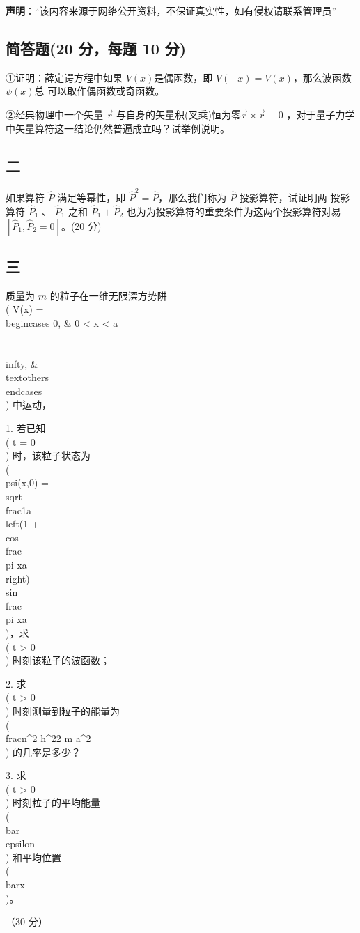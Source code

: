 
\textbf{声明}：“该内容来源于网络公开资料，不保证真实性，如有侵权请联系管理员”

\subsection{简答题(20 分，每题 10 分)}
①证明：薛定谔方程中如果 $V(x)$是偶函数，即 $V(-x)=V(x)$，那么波函数 $\psi(x)$总
可以取作偶函数或奇函数。

②经典物理中一个矢量 $\vec r$ 与自身的矢量积(叉乘)恒为零$\vec r \times \vec r\equiv
0$   ，对于量子力学
中矢量算符这一结论仍然普遍成立吗？试举例说明。

\subsection{二}
如果算符 $\hat{P}$ 满足等幂性，即 $\hat{P}^2 = \hat{P}$，那么我们称为 $\hat{P}$ 投影算符，试证明两
投影算符 $\hat{P}_1$ 、 $\hat{P}_1$ 之和 $\hat{P}_1+\hat{P}_2$ 也为为投影算符的重要条件为这两个投影算符对易$[\hat{P}_1,\hat{P}_2=0]$。(20 分)

\subsection{三}
质量为 $m$ 的粒子在一维无限深方势阱 \\( V(x) = \\begin{cases} 0, & 0 < x < a \\\\ \\infty, & \\text{others} \\end{cases} \\) 中运动，

1. 若已知 \\( t = 0 \\) 时，该粒子状态为 \\( \\psi(x,0) = \\sqrt{\\frac{1}{a}\\left(1 + \\cos \\frac{\\pi x}{a}\\right)} \\sin \\frac{\\pi x}{a} \\)，求 \\( t > 0 \\) 时刻该粒子的波函数；

2. 求 \\( t > 0 \\) 时刻测量到粒子的能量为 \\( \\frac{n^2 h^2}{2 m a^2} \\) 的几率是多少？

3. 求 \\( t > 0 \\) 时刻粒子的平均能量 \\( \\bar{\\epsilon} \\) 和平均位置 \\( \\bar{x} \\)。

（30 分）
